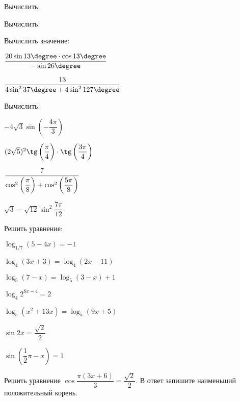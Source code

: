 \begin{listofex}
	\item Вычислить:
	\begin{enumcols}[itemcolumns=3]
		\item {}
		\item {}
		\item {}
		\item {}
		\item {}
		\item {}
		\item {}
	\end{enumcols}
	\item Вычислить:
	\begin{enumcols}[itemcolumns=2]
		\item {}
		\item {}
		\item {}
		\item {}
	\end{enumcols}
	\item Вычислить значение:
	\begin{enumcols}[itemcolumns=3]
		\item \( \dfrac{20\sin13\degree\cdot\cos13\degree}{-\sin26\degree} \)
		\item \( \dfrac{13}{4\sin^237\degree+4\sin^2127\degree} \)
		\item {}
	\end{enumcols}
	\item Вычислить:
	\begin{enumcols}[itemcolumns=2]
		\item \( -4\sqrt{3}\sin\left( -\dfrac{4\pi}{3} \right) \)
		\item \( (2\sqrt{5})^2\tg\left( \dfrac{\vphantom{3}\pi}{4} \right)\cdot\tg\left( \dfrac{3\pi}{4} \right) \)
		\item \( \dfrac{7}{\cos^2\left( \dfrac{\vphantom{9}\pi}{8} \right)+\cos^2\left( \dfrac{5\pi}{8} \right)} \)
		\item \( \sqrt{3}-\sqrt{12}\sin^2\dfrac{7\pi}{12} \)
	\end{enumcols}
	\item Решить уравнение:
	\begin{enumcols}[itemcolumns=2]
		\item \( \log_{1/7}(5-4x)=-1 \)
		\item \( \log_4(3x+3)=\log_4(2x-11) \)
		\item \( \log_5(7-x)=\log_5(3-x)+1 \)
		\item \( \log_4 2^{8x-4}=2 \)
		\item \( \log_5(x^2+13x)=\log_5(9x+5) \)
		\item \( \sin 2x = \dfrac{\sqrt{2}}{2} \)
		\item \( \sin \left( \dfrac{1}{2}\pi-x \right)=1 \)
	\end{enumcols}
	\item {}
	\item Решить уравнение \( \cos\dfrac{\pi(3x+6)}{3}=\dfrac{\sqrt{2}}{2} \). В ответ запишите наименьший положительный корень.
\end{listofex}
